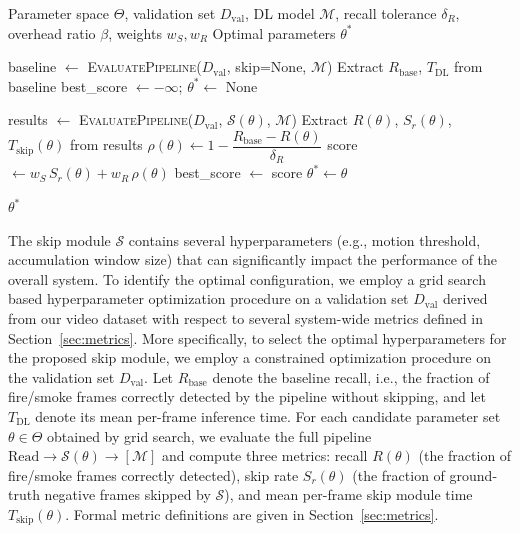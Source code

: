 \begin{algorithm}[htbp]
\caption{Skip Module Hyperparameter Selection}
\label{alg:hyperparam}
\begin{algorithmic}[1]

\Require Parameter space $\Theta$, validation set $D_{\text{val}}$,
DL model $\mathcal{M}$, recall tolerance $\delta_R$,
overhead ratio $\beta$, weights $w_S, w_R$
\Ensure Optimal parameters $\theta^*$

\State baseline $\gets$ \textsc{EvaluatePipeline}($D_{\text{val}}$, skip=None, $\mathcal{M}$)
\State Extract $R_{\text{base}}$, $T_{\text{DL}}$ from baseline
\State best\_score $\gets -\infty$; \quad $\theta^* \gets$ None

\State results $\gets$ \textsc{EvaluatePipeline}($D_{\text{val}}$, $\mathcal{S}(\theta)$, $\mathcal{M}$)
\State Extract $R(\theta)$, $S_r(\theta)$, $T_{\text{skip}}(\theta)$ from results
\State $\rho(\theta) \gets 1 - \dfrac{R_{\text{base}} - R(\theta)}{\delta_R}$
\State score $\gets w_S\, S_r(\theta) + w_R\, \rho(\theta)$
\State best\_score $\gets$ score
\State $\theta^* \gets \theta$
\EndIf
\EndIf
\EndFor

\State \Return $\theta^*$

\end{algorithmic}
\end{algorithm}

The skip module $\mathcal{S}$ contains several hyperparameters (e.g., motion
threshold, accumulation window size) that can significantly impact the
performance of the overall system. To identify the optimal configuration, we
employ a grid search based hyperparameter optimization procedure on a validation
set $D_{\text{val}}$ derived from our video dataset with respect to several
system-wide metrics defined in Section~\ref{sec:metrics}. More specifically, to
select the optimal hyperparameters for the proposed skip module, we employ a
constrained optimization procedure on the validation set $D_{\text{val}}$. Let
$R_{\text{base}}$ denote the baseline recall, i.e., the fraction of fire/smoke
frames correctly detected by the pipeline without skipping, and let $T_{\text{DL}}$
denote its mean per-frame inference time. For each candidate parameter set
$\theta \in \Theta$ obtained by grid search, we evaluate the full pipeline
$\text{Read} \rightarrow \mathcal{S}(\theta) \rightarrow [\mathcal{M}]$ and
compute three metrics: recall $R(\theta)$ (the fraction of fire/smoke frames
correctly detected), skip rate $S_r(\theta)$ (the fraction of ground-truth
negative frames skipped by $\mathcal{S}$), and mean per-frame skip module time
$T_{\text{skip}}(\theta)$. Formal metric definitions are given in
Section~\ref{sec:metrics}.


